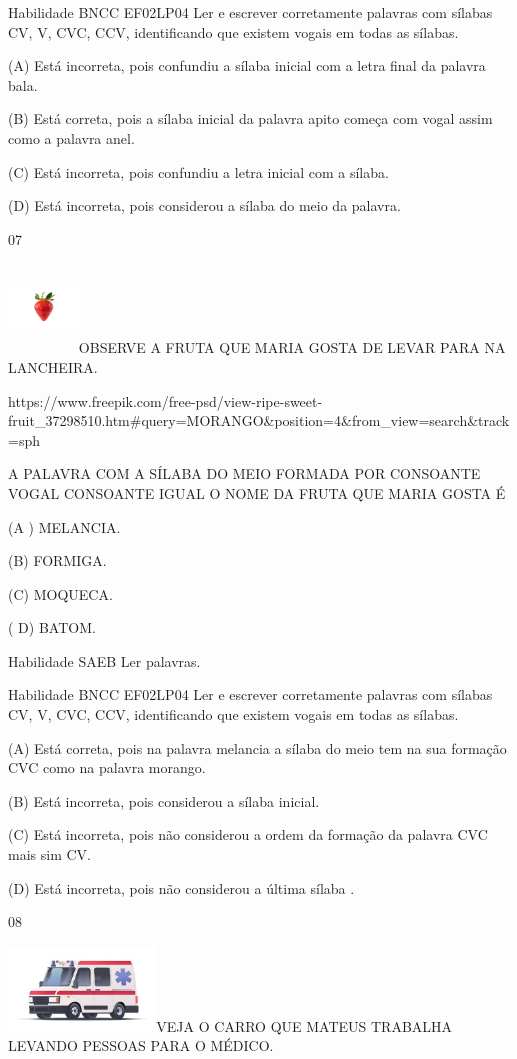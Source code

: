 {{{{{{Habilidade BNCC EF02LP04 Ler e escrever corretamente palavras com
sílabas CV, V, CVC, CCV, identificando que existem vogais em todas as
sílabas.

(A) Está incorreta, pois confundiu a sílaba inicial com a letra final da
palavra bala.

(B) Está correta, pois a sílaba inicial da palavra apito começa com
vogal assim como a palavra anel.

(C) Está incorreta, pois confundiu a letra inicial com a sílaba.

(D) Está incorreta, pois considerou a sílaba do meio da palavra.

\num{07}

\includegraphics[width=0.73819in,height=0.93750in]{media/image152.jpeg}OBSERVE
A FRUTA QUE MARIA GOSTA DE LEVAR PARA NA LANCHEIRA.

https://www.freepik.com/free-psd/view-ripe-sweet-fruit\_37298510.htm\#query=MORANGO\&position=4\&from\_view=search\&track=sph

\protect\hypertarget{_Hlk129368984}{}{}A PALAVRA COM A SÍLABA DO MEIO
FORMADA POR CONSOANTE VOGAL CONSOANTE IGUAL O NOME DA FRUTA QUE MARIA
GOSTA É

(A ) MELANCIA.

(B) FORMIGA.

(C) MOQUECA.

( D) BATOM.

\protect\hypertarget{_Hlk129369076}{}{} Habilidade SAEB Ler palavras.

Habilidade BNCC EF02LP04 Ler e escrever corretamente palavras com
sílabas CV, V, CVC, CCV, identificando que existem vogais em todas as
sílabas.

(A) Está correta, pois na palavra melancia a sílaba do meio tem na sua
formação CVC como na palavra morango.

(B) Está incorreta, pois considerou a sílaba inicial.

(C) Está incorreta, pois não considerou a ordem da formação da palavra
CVC mais sim CV.

(D) Está incorreta, pois não considerou a última sílaba .

\num{08}

\includegraphics[width=1.54514in,height=0.89444in]{media/image153.jpeg}VEJA
O CARRO QUE MATEUS TRABALHA LEVANDO PESSOAS PARA O MÉDICO.

}}}}}}
